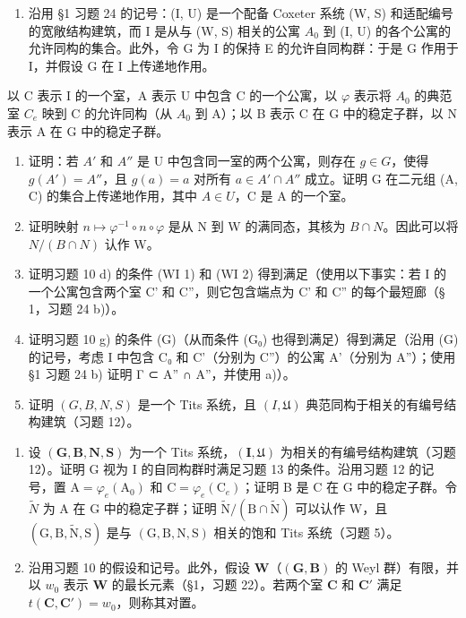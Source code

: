 \begin{enumerate}
\def\labelenumi{\arabic{enumi})}
\setcounter{enumi}{12}
\tightlist
\item
  沿用 §1 习题 24 的记号：(I, U) 是一个配备 Coxeter 系统 (W, S) 和适配编号的宽敞结构建筑，而 I 是从与 (W, S) 相关的公寓 \(A_{0}\) 到 (I, U) 的各个公寓的允许同构的集合。此外，令 G 为 I 的保持 E 的允许自同构群：于是 G 作用于 I，并假设 G 在 I 上传递地作用。
\end{enumerate}

以 C 表示 I 的一个室，A 表示 U 中包含 C 的一个公寓，以 \(\varphi\) 表示将 \(A_{0}\) 的典范室 \(C_{e}\) 映到 C 的允许同构（从 \(A_{0}\) 到 A）；以 B 表示 C 在 G 中的稳定子群，以 N 表示 A 在 G 中的稳定子群。

\begin{enumerate}
\def\labelenumi{\alph{enumi})}
\item
  证明：若 \(A'\) 和 \(A''\) 是 U 中包含同一室的两个公寓，则存在 \(g \in G\)，使得 \(g(A') = A''\)，且 \(g(a) = a\) 对所有 \(a \in A' \cap A''\) 成立。证明 G 在二元组 (A, C) 的集合上传递地作用，其中 \(A \in U\)，C 是 A 的一个室。
\item
  证明映射 \(n \mapsto \varphi^{-1} \circ n \circ \varphi\) 是从 N 到 W 的满同态，其核为 \(B \cap N\)。因此可以将 \(N/(B \cap N)\) 认作 W。
\item
  证明习题 10 d) 的条件 (WI 1) 和 (WI 2) 得到满足（使用以下事实：若 I 的一个公寓包含两个室 C' 和 C''，则它包含端点为 C' 和 C'' 的每个最短廊（§ 1，习题 24 b)）。
\item
  证明习题 10 g) 的条件 (G)（从而条件 (G₀) 也得到满足）得到满足（沿用 (G) 的记号，考虑 I 中包含 C₀ 和 C'（分别为 C''）的公寓 A'（分别为 A''）；使用 §1 习题 24 b) 证明 Γ ⊂ A'' ∩ A''，并使用 a)）。
\item
  证明 \((G, B, N, S)\) 是一个 Tits 系统，且 \((I, \mathfrak{U})\) 典范同构于相关的有编号结构建筑（习题 12）。
\end{enumerate}

\begin{enumerate}
\def\labelenumi{\arabic{enumi})}
\setcounter{enumi}{13}
\item
  设 \((\mathbf{G},\mathbf{B},\mathbf{N},\mathbf{S})\) 为一个 Tits 系统，\((\mathbf{I},\mathfrak{U})\) 为相关的有编号结构建筑（习题 12）。证明 G 视为 I 的自同构群时满足习题 13 的条件。沿用习题 12 的记号，置 \(\mathrm{A}=\varphi_{e}(\mathrm{A}_{0})\) 和 \(\mathrm{C}=\varphi_{e}(\mathrm{C}_{e})\)；证明 B 是 C 在 G 中的稳定子群。令 \(\tilde{N}\) 为 A 在 G 中的稳定子群；证明 \(\tilde{\mathrm{N}}/(\mathrm{B}\cap\tilde{\mathrm{N}})\) 可以认作 W，且 \((\mathrm{G},\mathrm{B},\tilde{\mathrm{N}},\mathrm{S})\) 是与 \((\mathrm{G},\mathrm{B},\mathrm{N},\mathrm{S})\) 相关的饱和 Tits 系统（习题 5）。
\item
  沿用习题 10 的假设和记号。此外，假设 \(\mathbf{W}\)（\((\mathbf{G},\mathbf{B})\) 的 Weyl 群）有限，并以 \(w_0\) 表示 \(\mathbf{W}\) 的最长元素（§1，习题 22）。若两个室 \(\mathbf{C}\) 和 \(\mathbf{C}'\) 满足 \(t(\mathbf{C},\mathbf{C}') = w_0\)，则称其对置。
\end{enumerate}

